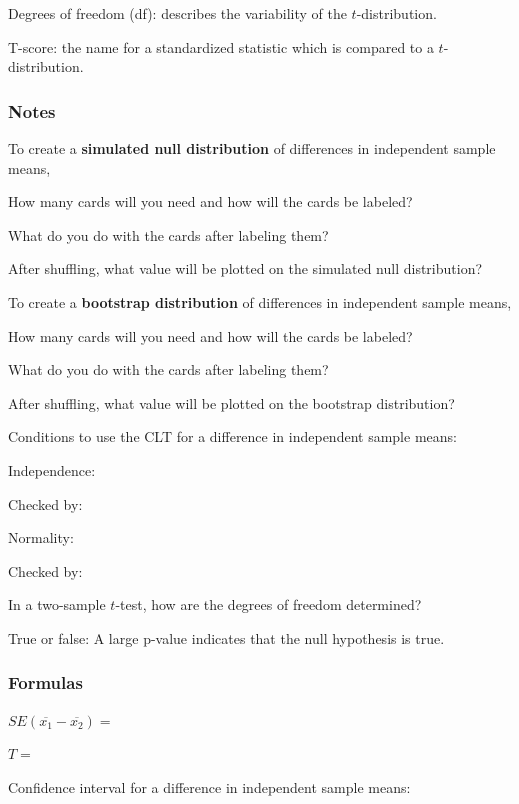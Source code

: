 \documentclass[
]{report}
\newcommand{\rgs}{\vspace{12pt}} %
\newcommand{\rgi}{\hspace{24pt}}  %
\begin{document}
Degrees of freedom (df): describes the variability of the \(t\)-distribution.

T-score: the name for a standardized statistic which is compared to a \(t\)-distribution.

\hypertarget{notes-24}{%
\subsubsection*{Notes}\label{notes-24}}

To create a \textbf{simulated null distribution} of differences in independent sample means,

\rgi How many cards will you need and how will the cards be labeled?
\rgs

\rgi What do you do with the cards after labeling them?
\rgs

\rgi After shuffling, what value will be plotted on the simulated null distribution?
\rgs

To create a \textbf{bootstrap distribution} of differences in independent sample means,

\rgi How many cards will you need and how will the cards be labeled?
\rgs

\rgi What do you do with the cards after labeling them?
\rgs

\rgi After shuffling, what value will be plotted on the bootstrap distribution?
\rgs

Conditions to use the CLT for a difference in independent sample means:

\rgi Independence:
\rgs

\rgi \rgi Checked by:
\rgs

\rgi Normality:
\rgs

\rgi \rgi Checked by:
\rgs

In a two-sample \(t\)-test, how are the degrees of freedom determined?
\rgs        

True or false: A large p-value indicates that the null hypothesis is true.
\rgs

\hypertarget{formulas-5}{%
\subsubsection*{Formulas}\label{formulas-5}}

\(SE(\overline{x_1} - \overline{x_2})=\)
\rgs

\(T=\)
\rgs

Confidence interval for a difference in independent sample means:
\rgs
\end{document}
